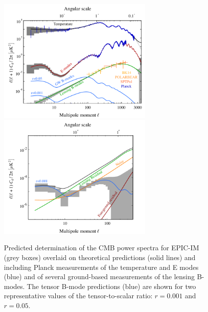 \begin{figure}[ht!]
\begin{center}
\includegraphics[width=3in]{figs/cmb_powspec_v1.pdf}  
\includegraphics[width=3in]{figs/cmbbb_powspec_v1.pdf}
\end{center}
\vspace{-0.25in}
\caption{ \small \setlength{\baselineskip}{0.95\baselineskip}
Predicted determination of the \ac{CMB} power spectra for EPIC-IM (grey boxes) overlaid
on theoretical predictions (solid lines) and including Planck measurements of the 
temperature and E modes (blue) and of several ground-based measurements 
of the lensing B-modes.  The tensor B-mode predictions (blue) are shown 
for two representative values of the tensor-to-scalar
ratio: $r=0.001$ and $r=0.05.$ 
\label{fig:clall} }
\vspace{-0.05in}
\end{figure}



